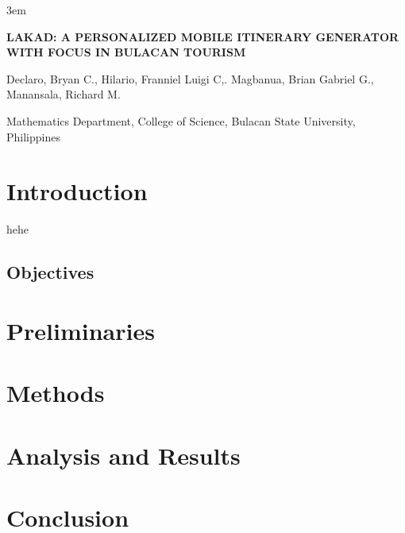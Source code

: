 \documentclass[11pt,a4paper]{report}
\author{
Franniel Luigi Hilario
}
\begin{document}
\emergencystretch 3em
\sloppy
\onehalfspacing

\begin{titlepage}
\centering %

\begin{minipage}[c][3\baselineskip][c]{0.9\linewidth}
\centering\bfseries\large\MakeUppercase{
	Lakad: A Personalized Mobile Itinerary Generator with Focus in Bulacan Tourism
}
\end{minipage}

\vspace{10pt}
{\centering Declaro, Bryan C., Hilario, Franniel Luigi C,. Magbanua, Brian Gabriel G.,\\ Manansala, Richard M.  }

\vspace{10pt}

{
Mathematics Department, College of Science, Bulacan State University, Philippines
}

\vspace{1in}
\begin{justify}

\end{justify}
\end{titlepage}

\chapter*{Introduction}
hehe


\section{Objectives}


\chapter*{Preliminaries}

\chapter*{Methods}


\chapter*{Analysis and Results}

\chapter*{Conclusion}
\end{document}
